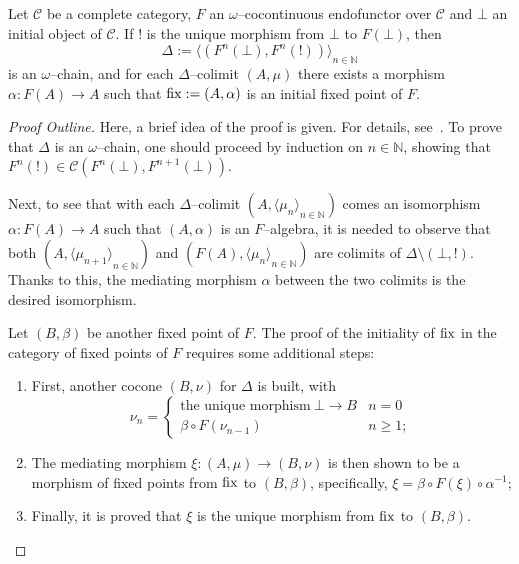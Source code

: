\begin{thm}\label{thm:init}
  Let \(\mathcal{C}\) be a complete category, \(F\) an \(\omega{}\)--cocontinuous endofunctor over \(\mathcal{C}\) and \(\bot{}\) an initial object of \(\mathcal{C}\). If \(!{}\) is the unique morphism from \(\bot{}\) to \(F(\bot{})\), then
  \begin{equation}
    \Delta := {\langle(F^n(\bot),F^n(!))\rangle}_{n \in \mathbb{N}}
  \end{equation}
  is an \(\omega{}\)--chain, and for each \(\Delta\)--colimit \((A,\mu)\) there exists a morphism \(\alpha \colon F(A) \to A\) such that \(\operatorname{fix} := (A,\alpha)\) is an initial fixed point of \(F\). %
\end{thm}
\begin{proof}[Proof Outline]
  Here, a brief idea of the proof is given. For details, see~\cite{Hemerik1988}.
  To prove that \(\Delta{}\) is an \(\omega{}\)--chain, one should proceed by induction on \(n \in \mathbb{N}\), showing that \(F^n(!) \in \mathcal{C}(F^n(\bot),F^{n+1}(\bot))\).

  Next, to see that with each \(\Delta\)--colimit \((A,{\langle\mu_n \rangle}_{n\in\mathbb{N}})\) comes an isomorphism \(\alpha \colon F(A) \to A\) such that \((A,\alpha)\) is an \(F\)--algebra, it is needed to observe that both \((A,{\langle \mu_{n+1} \rangle}_{n\in\mathbb{N}})\) and \((F(A),{\langle\mu_n \rangle}_{n\in\mathbb{N}})\) are colimits of \(\Delta \setminus (\bot,!)\).
  Thanks to this, the mediating morphism \(\alpha{}\) between the two colimits is the desired isomorphism.

  Let \((B,\beta)\) be another fixed point of \(F\). The proof of the initiality of \(\operatorname{fix}\) in the category of fixed points of \(F\) requires some additional steps:
  \begin{enumerate}
    \item First, another cocone \((B,\nu)\) for \(\Delta{}\) is built, with
    \begin{equation*}
      \nu_n =
      \begin{cases}
        \text{the unique morphism}\: \bot \to B & n = 0 \\
        \beta \circ F(\nu_{n-1}) & n \ge 1;
      \end{cases}
    \end{equation*}
    \item The mediating morphism \(\xi \colon (A,\mu) \to (B, \nu)\) is then shown to be a morphism of fixed points from \(\operatorname{fix}\) to \((B,\beta)\), specifically, \(\xi = \beta \circ F(\xi) \circ \alpha^{-1}\);
    \item Finally, it is proved that \(\xi{}\) is the unique morphism from \(\operatorname{fix}\) to \((B,\beta)\).
  \end{enumerate}
\end{proof}
